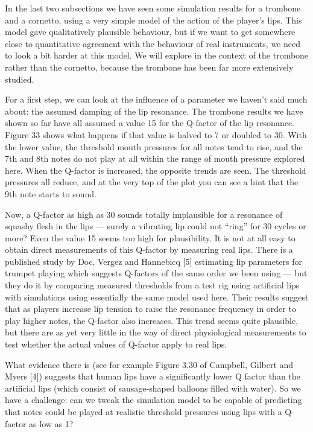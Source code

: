 
  In the last two subsections we have seen some simulation results for a 
  trombone and a cornetto, using a very simple model of the action of the 
  player’s lips. This model gave qualitatively plausible behaviour, but if we 
  want to get somewhere close to quantitative agreement with the behaviour of 
  real instruments, we need to look a bit harder at this model. We will explore 
  in the context of the trombone rather than the cornetto, because the trombone 
  has been far more extensively studied. 

  For a first step, we can look at the influence of a parameter we haven’t said 
  much about: the assumed damping of the lip resonance. The trombone results we 
  have shown so far have all assumed a value 15 for the Q-factor of the lip 
  resonance. Figure 33 shows what happens if that value is halved to 7 or 
  doubled to 30. With the lower value, the threshold mouth pressures for all 
  notes tend to rise, and the 7th and 8th notes do not play at all within the 
  range of mouth pressure explored here. When the Q-factor is increased, the 
  opposite trends are seen. The threshold pressures all reduce, and at the very 
  top of the plot you can see a hint that the 9th note starts to sound. 

  Now, a Q-factor as high as 30 sounds totally implausible for a resonance of 
  squashy flesh in the lips --- surely a vibrating lip could not ``ring'' for 
  30 cycles or more? Even the value 15 seems too high for plausibility. It is 
  not at all easy to obtain direct measurements of this Q-factor by measuring 
  real lips. There is a published study by Doc, Vergez and Hannebicq [5] 
  estimating lip parameters for trumpet playing which suggests Q-factors of the 
  same order we been using — but they do it by comparing measured thresholds 
  from a test rig using artificial lips with simulations using essentially the 
  same model used here. Their results suggest that as players increase lip 
  tension to raise the resonance frequency in order to play higher notes, the 
  Q-factor also increases. This trend seems quite plausible, but there are as 
  yet very little in the way of direct physiological measurements to test 
  whether the actual values of Q-factor apply to real lips. 

  What evidence there is (see for example Figure 3.30 of Campbell, Gilbert and 
  Myers [4]) suggests that human lips have a significantly lower Q factor than 
  the artificial lips (which consist of sausage-shaped balloons filled with 
  water). So we have a challenge: can we tweak the simulation model to be 
  capable of predicting that notes could be played at realistic threshold 
  pressures using lips with a Q-factor as low as 1? 

